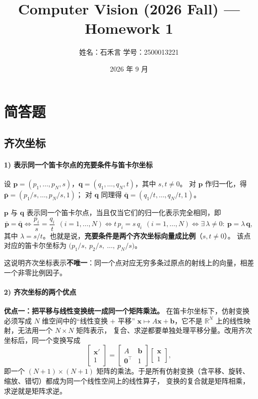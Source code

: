 \documentclass[11pt,a4paper]{ctexart}
\title{\textbf{Computer Vision (2026 Fall) --- Homework 1}}
\author{姓名：石禾言 \qquad 学号：2500013221}
\date{2026 年 9 月}
\begin{document}
\maketitle

\section{简答题}

\subsection{齐次坐标}

\paragraph{1) 表示同一个笛卡尔点的充要条件与笛卡尔坐标}

设 $\mathbf p=(p_1,\dots,p_N,s)$，$\mathbf q=(q_1,\dots,q_N,t)$，其中 $s,t\neq 0$。
对 $\mathbf p$ 作归一化，得 $\bar{\mathbf p}=(p_1/s,\dots,p_N/s,1)$；
对 $\mathbf q$ 同理得 $\bar{\mathbf q}=(q_1/t,\dots,q_N/t,1)$。

$\mathbf p$ 与 $\mathbf q$ 表示同一个笛卡尔点，当且仅当它们的归一化表示完全相同，即
\begin{equation}
\bar{\mathbf p}=\bar{\mathbf q}
\iff \frac{p_i}{s}=\frac{q_i}{t}\ \ (i=1,\dots,N)
\iff t\,p_i=s\,q_i\ \ (i=1,\dots,N)
\iff \exists\,\lambda\neq 0:\ \mathbf p=\lambda\,\mathbf q,
\end{equation}
其中 $\lambda=s/t$。也就是说，\textbf{充要条件是两个齐次坐标向量成比例}（$s,t\neq 0$）。
该点对应的笛卡尔坐标为 $\bigl(p_1/s,\ p_2/s,\ \dots,\ p_N/s\bigr)$。

这说明齐次坐标表示\textbf{不唯一}：同一个点对应无穷多条过原点的射线上的向量，相差一个非零比例因子。

\paragraph{2) 齐次坐标的两个优点}

\textbf{优点一：把平移与线性变换统一成同一个矩阵乘法。}
在笛卡尔坐标下，仿射变换必须写成 $N$ 维空间中的“线性变换 $+$ 平移”
$\mathbf x\mapsto A\mathbf x+\mathbf b$，它不是 $\mathbb R^N$ 上的线性映射，无法用一个 $N\times N$ 矩阵表示，
复合、求逆都要单独处理平移分量。改用齐次坐标后，同一个变换写成
\begin{equation}
\begin{bmatrix}\mathbf x'\\ 1\end{bmatrix}
=\begin{bmatrix}A&\mathbf b\\ \mathbf 0^\top &1\end{bmatrix}
\begin{bmatrix}\mathbf x\\ 1\end{bmatrix},
\end{equation}
即一个 $(N{+}1)\times(N{+}1)$ 矩阵的乘法。于是所有仿射变换（含平移、旋转、缩放、错切）都成为同一个线性空间上的线性算子，
变换的复合就是矩阵相乘，求逆就是矩阵求逆。
\end{document}
